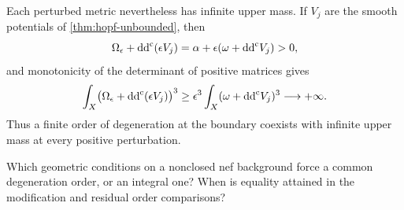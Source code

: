 Each perturbed metric nevertheless has infinite upper mass. If $V_j$ are the smooth potentials of \cref{thm:hopf-unbounded}, then
\[
 \Omega_\epsilon+\mathrm{dd}^{\mathrm{c}}(\epsilon V_j)
       =\alpha+\epsilon(\omega+\mathrm{dd}^{\mathrm{c}} V_j)>0,
\]
and monotonicity of the determinant of positive matrices gives
\[
 \int_X\bigl(\Omega_\epsilon+\mathrm{dd}^{\mathrm{c}}(\epsilon V_j)\bigr)^3
       \geq\epsilon^3\int_X(\omega+\mathrm{dd}^{\mathrm{c}} V_j)^3\longrightarrow+\infty.
\]
Thus a finite order of degeneration at the boundary coexists with infinite upper mass at every positive perturbation.










\begin{problem}\label{qu:nef-degeneration-exponent}
Which geometric conditions on a nonclosed nef background force a common degeneration order, or an integral one? When is equality attained in the modification and residual order comparisons?
\end{problem}
